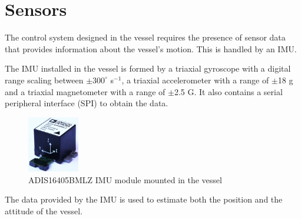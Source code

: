 \section{Sensors}\label{sec:sensors}
The control system designed in the vessel requires the presence of sensor data that provides information about the vessel's motion. This is handled by an IMU.

The IMU installed in the vessel is formed by a triaxial gyroscope with a digital range scaling between $\pm300^{\circ}$ s$^{-1}$, a triaxial accelerometer with a range of $\pm$18 g and a triaxial magnetometer with a range of $\pm$\num{2.5} G. It also contains a serial peripheral interface (SPI) to obtain the data. \cite{IMUDatasheet}
%
\begin{figure}[H]
	\includegraphics[width=0.2\textwidth]{figures/IMU}
	\caption{ADIS16405BMLZ IMU module mounted in the vessel \cite{IMUFigure}}
	\label{fig:IMU}
\end{figure}
%
The data provided by the IMU is used to estimate both the position and the attitude of the vessel.


%
